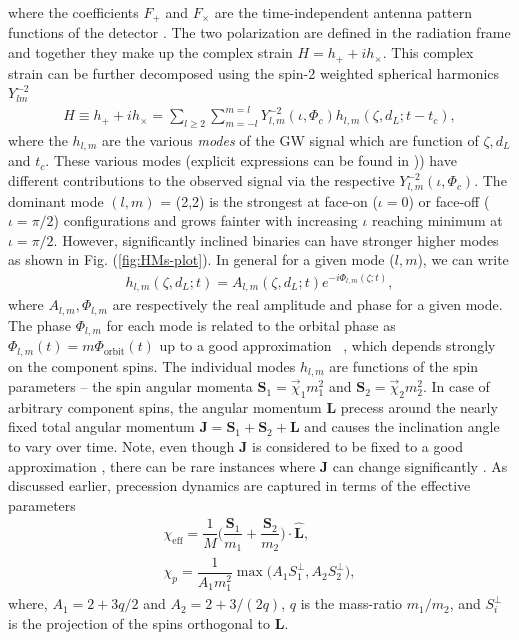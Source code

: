 where the coefficients $F_{+}$ and $F_{\times}$ are the time-independent antenna pattern functions of the detector \cite{Finn:1992xs, Jaranowski:1998qm}. The two polarization are defined in the radiation frame and together they make up the complex strain $H = h_{+} + i h_{\times}$. This complex strain can be further decomposed using the spin-2 weighted spherical harmonics $Y^{-2}_{lm}$ \cite{Brown:2007jx}
\begin{align}
        \label{Eq:spherical_harmonics}
    H \equiv h_+ + ih_{\times} = \sum_{l\geq2}\sum_{m=-l}^{m=l} Y^{-2}_{l,m}(\iota, \Phi_c) h_{l,m}(\zeta, d_L ;t-t_c),
\end{align}
where the $h_{l,m}$ are the various \textit{modes} of the GW signal which are function of $\zeta, d_L$ and $t_c$. These various modes  (explicit expressions can be found in \cite{Mills:2020thr})) have different contributions to the observed signal via the respective $Y^{-2}_{l,m}(\iota, \Phi_c)$. The dominant mode $(l,m)$ = (2,2) is the strongest at face-on ($\iota=0$) or face-off ($\iota = \pi/2$) configurations and grows fainter with increasing $\iota$ reaching minimum at $\iota = \pi/2$. However, significantly inclined binaries can have stronger higher modes as shown in Fig. (\ref{fig:HMs-plot}). In general for a given mode ($l, m$), we can write  
\begin{align}
    h_{l,m}(\zeta, d_L; t) = A_{l,m}(\zeta, d_L; t)e^{-i\Phi_{l,m}(\zeta;t)},
    \label{Eq:single_mode}
\end{align} 
where $A_{l,m}, \Phi_{l,m}$ are respectively the real amplitude and phase for a given mode. The phase $\Phi_{l, m}$ for each mode is related to the orbital phase as $\Phi_{l,m}(t) = m\Phi_{\text{orbit}}(t)$ up to a good approximation ~\cite{Apostolatos:1994mx}, which depends strongly on the component spins. The individual modes $h_{l,m}$ are functions of the spin parameters -- the spin angular momenta $\textbf{S}_1 = \vec{\chi}_1 m_1^2$ and $\textbf{S}_2= \vec{\chi}_2 m_2^2$. In case of arbitrary component spins, the angular momentum \textbf{L} precess around the nearly fixed total angular momentum $\textbf{J} = \textbf{S}_1 + \textbf{S}_2 + \textbf{L}$ and causes the inclination angle to vary over time. Note, even though $\textbf{J}$ is considered to be fixed to a good approximation \cite{Apostolatos:1994mx}, there can be rare instances where $\textbf{J}$ can change significantly \cite{Apostolatos:1994mx}. As discussed earlier, precession dynamics are captured in terms of the effective parameters  \cite{Ajith:2009bn, Schmidt:2014iyl}
\begin{align}
    \chi_{\text{eff}} = \dfrac{1}{M}\Bigg(\dfrac{\textbf{S}_1}{m_1}+\dfrac{\textbf{S}_2}{m_2}\Bigg)\cdot\hat{\textbf{L}}, \label{eq:chi_eff}\\
    \chi_{p} = \dfrac{1}{A_1m_1^2}\max\Big(A_1 S_1^{\perp},A_2 S_2^{\perp}\Big), \label{eq:chi_P}
\end{align} 
where, $A_1=2+3q/2$ and $A_2 = 2 + 3/(2q)$, $q$ is the mass-ratio $m_1/m_2$, and $S_i^{\perp}$ is the projection of the spins orthogonal to $\textbf{L}$. 


